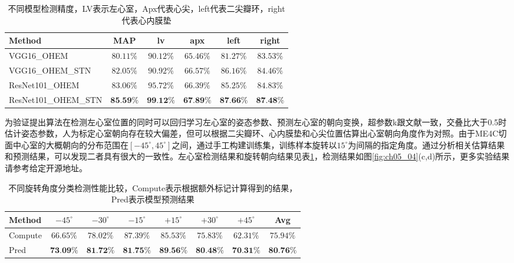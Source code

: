 \begin{table}[!htbp]
    \centering
    \footnotesize%
    \setlength{\tabcolsep}{4pt}%
    \renewcommand{\arraystretch}{1.2}%
    \begin{tabular}{lccccc}
        \cline{1-6}%
           \qquad Method  & MAP & lv &apx &left &right\\
         
        \hline
        VGG16\_OHEM & $80.11\%$ & $90.12\%$& $65.46\%$ & $81.27\%$& $83.53\%$\\        
        \hline
        VGG16\_OHEM\_STN & $82.05\%$ & $90.92\%$& $66.57\%$& $86.16\%$& $84.46\%$ \\
        \hline
        ResNet101\_OHEM & $83.06\%$ & $95.72\%$& $66.39\%$& $85.25\%$& $84.83\%$ \\
        \hline
        ResNet101\_OHEM\_STN & $\textbf{85.59\%}$ & $\textbf{99.12\%}$ & $\textbf{67.89\%}$ & $\textbf{87.66\%}$ & $\textbf{87.48\%}$\\
        \hline\hline
    \end{tabular}
    \caption{不同模型检测精度，LV表示左心室，Apx代表心尖，left代表二尖瓣环，right代表心内膜垫}
    \label{tab:ch05_03}
\end{table}


为验证提出算法在检测左心室位置的同时可以回归学习左心室的姿态参数、预测左心室的朝向变换，超参数k跟文献一致，交叠比大于0.5时估计姿态参数，人为标定心室朝向存在较大偏差，但可以根据二尖瓣环、心内膜垫和心尖位置估算出心室朝向角度作为对照。由于ME4C切面中心室的大概朝向的分布范围在$[-45^{\circ},45^{\circ}]$之间，通过手工构建训练集，训练样本旋转以$15^{\circ}$为间隔的指定角度。通过分析相关估算结果和预测结果，可以发现二者具有很大的一致性。左心室检测结果和旋转朝向结果见表\ref{tab:ch05_03}，检测结果如图\ref{fig:ch05_04}(c,d)所示，更多实验结果请参考给定开源地址。
\begin{table}[!htbp]
    \centering
    \footnotesize%
    \setlength{\tabcolsep}{4pt}%
    \renewcommand{\arraystretch}{1.2}%
    \begin{tabular}{lccccccc}
        \cline{1-8}%
            Method  & $-45^{\circ}$ & $-30^{\circ}$ & $-15^{\circ}$ & $+15^{\circ}$ & $+30^{\circ}$&$ +45^{\circ}$& Avg\\
         
        \hline
        Compute & $66.65\%$ & $78.02\%$& $87.39\%$& $85.53\%$& $75.83\%$ &$62.31\%$ &$75.94\%$  \\
        \hline
        Pred & $\textbf{73.09\%}$ & $\textbf{81.72\%}$ & $\textbf{81.75\%}$ & $\textbf{89.56\%}$ & $\textbf{80.48\%}$& $\textbf{70.31\%}$& $\textbf{80.76\%}$\\
        \hline\hline
    \end{tabular}
    \caption{不同旋转角度分类检测性能比较，Compute表示根据额外标记计算得到的结果，Pred表示模型预测结果}
    \label{tab:ch05_04}
\end{table}

